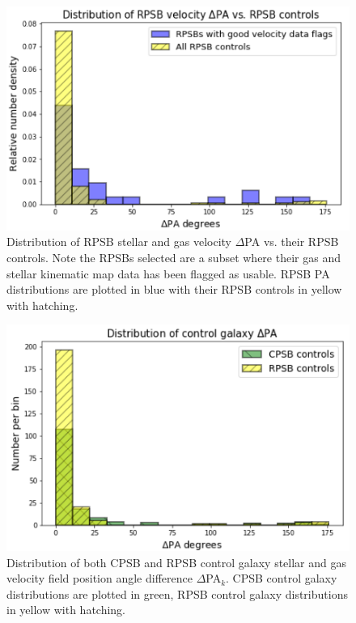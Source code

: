 \begin{figure}
    \centering
    \includegraphics[width=\columnwidth]{images/JupyterPlots/DIST-Good-RPSB+Flags+Controls.png}
    \caption[Distribution of RPSB velocity $\Delta$PA vs. their RPSB controls]{Distribution of RPSB stellar and gas velocity $\Delta$PA vs. their RPSB controls. Note the RPSBs selected are a subset where their gas and stellar kinematic map data has been flagged as usable. RPSB PA distributions are plotted in blue with their RPSB controls in yellow with hatching.}
    \label{fig:RPSBvsControlDeltaPAs}
\end{figure}


\begin{figure}
    \centering
    \includegraphics[width=\columnwidth]{images/JupyterPlots/DIST-Control-DPA-both.png}
    \caption[Distribution of control galaxy $\Delta$PA$_{k}$]{Distribution of both CPSB and RPSB control galaxy stellar and gas velocity field position angle difference $\Delta$PA$_{k}$. CPSB control galaxy distributions are plotted in green, RPSB control galaxy distributions in yellow with hatching.}
    \label{fig:controlDeltaPAs}
\end{figure}

